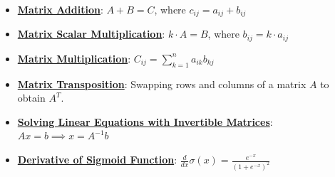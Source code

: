 \documentclass{article}%
\begin{document}
\begin{itemize}[leftmargin=*]%
\item \href{https://purdue.brightspace.com/d2l/common/assets/pdfjs-d2l-dist/1.0.14-legacy/web/viewer.html?file=%2Fcontent%2Fenforced%2F1095467-wl.202510.CS.24300.001%2F04L1-Linear Algebra Primer.pdf%3Fou%3D1095467&lang=en-us&container=d2l-fileviewer-rendered-pdf&fullscreen=d2l-fileviewer-rendered-pdf-dialog&height=667#page=9}{\textbf{Matrix Addition}}: $A + B = C$, where $c_{ij} = a_{ij} + b_{ij}$%
\item \href{https://purdue.brightspace.com/d2l/common/assets/pdfjs-d2l-dist/1.0.14-legacy/web/viewer.html?file=%2Fcontent%2Fenforced%2F1095467-wl.202510.CS.24300.001%2F04L1-Linear Algebra Primer.pdf%3Fou%3D1095467&lang=en-us&container=d2l-fileviewer-rendered-pdf&fullscreen=d2l-fileviewer-rendered-pdf-dialog&height=667#page=9}{\textbf{Matrix Scalar Multiplication}}: $k \cdot A = B$, where $b_{ij} = k \cdot a_{ij}$%
\item \href{https://purdue.brightspace.com/d2l/common/assets/pdfjs-d2l-dist/1.0.14-legacy/web/viewer.html?file=%2Fcontent%2Fenforced%2F1095467-wl.202510.CS.24300.001%2F04L1-Linear Algebra Primer.pdf%3Fou%3D1095467&lang=en-us&container=d2l-fileviewer-rendered-pdf&fullscreen=d2l-fileviewer-rendered-pdf-dialog&height=667#page=14}{\textbf{Matrix Multiplication}}: $C_{ij} = \sum_{k=1}^{n} a_{ik}b_{kj}$%
\item \href{https://purdue.brightspace.com/d2l/common/assets/pdfjs-d2l-dist/1.0.14-legacy/web/viewer.html?file=%2Fcontent%2Fenforced%2F1095467-wl.202510.CS.24300.001%2F04L1-Linear Algebra Primer.pdf%3Fou%3D1095467&lang=en-us&container=d2l-fileviewer-rendered-pdf&fullscreen=d2l-fileviewer-rendered-pdf-dialog&height=667#page=16}{\textbf{Matrix Transposition}}: Swapping rows and columns of a matrix $A$ to obtain $A^T$.%
\item \href{https://purdue.brightspace.com/d2l/common/assets/pdfjs-d2l-dist/1.0.14-legacy/web/viewer.html?file=%2Fcontent%2Fenforced%2F1095467-wl.202510.CS.24300.001%2F04L1-Linear Algebra Primer.pdf%3Fou%3D1095467&lang=en-us&container=d2l-fileviewer-rendered-pdf&fullscreen=d2l-fileviewer-rendered-pdf-dialog&height=667#page=12}{\textbf{Solving Linear Equations with Invertible Matrices}}: $Ax = b \implies x = A^{-1}b$%
\item \href{https://purdue.brightspace.com/d2l/common/assets/pdfjs-d2l-dist/1.0.14-legacy/web/viewer.html?file=%2Fcontent%2Fenforced%2F1095467-wl.202510.CS.24300.001%2F04L1-Linear Algebra Primer.pdf%3Fou%3D1095467&lang=en-us&container=d2l-fileviewer-rendered-pdf&fullscreen=d2l-fileviewer-rendered-pdf-dialog&height=667#page=21}{\textbf{Derivative of Sigmoid Function}}: $\frac{d}{dx} \sigma(x) = \frac{e^{-x}}{(1 + e^{-x})^2}$%
\end{itemize}%
\end{document}
